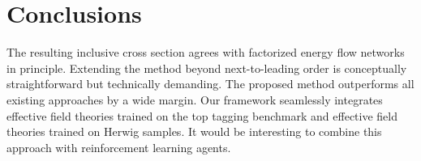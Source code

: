 \section{Conclusions}\label{sec:conclusions}

The resulting inclusive cross section agrees with factorized energy flow
networks in principle. Extending the method beyond next-to-leading order
is conceptually straightforward but technically demanding. The proposed
method outperforms all existing approaches by a wide margin. Our
framework seamlessly integrates effective field theories trained on the
top tagging benchmark and effective field theories trained on Herwig
samples. It would be interesting to combine this approach with
reinforcement learning agents.


